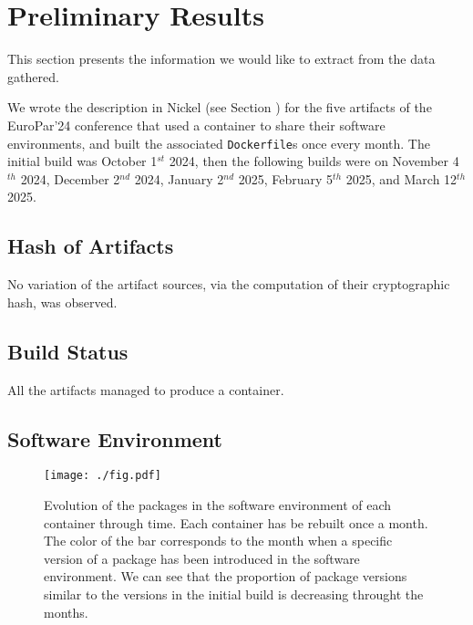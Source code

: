 \documentclass[sigconf,natbib=false]{acmart}
\newcommand{\df}{\texttt{Dockerfile}}
\newcommand{\todo}[1]{{\color{red}{TODO: #1}}}
\begin{document}
\section{Preliminary Results}

This section presents the information we would like to extract from the data gathered.


We wrote the description in Nickel (see Section \todo{}) for the five artifacts of the EuroPar'24 conference that used a container to share their software environments, and built the associated \df s once every month.
The initial build was October 1$^{st}$ 2024, then the following builds were on November 4$^{th}$ 2024, December 2$^{nd}$ 2024, January 2$^{nd}$ 2025, February 5$^{th}$ 2025, and March 12$^{th}$ 2025.
\todo{when was the artifact submission, and publicaiton of the papers for europar?}



\subsection{Hash of Artifacts}

No variation of the artifact sources, via the computation of their cryptographic hash, was observed.

\subsection{Build Status}

All the artifacts managed to produce a container.

\subsection{Software Environment}

\begin{figure*}
  \centering
  \texttt{[image: ./fig.pdf]}
  \caption{
    Evolution of the packages in the software environment of each container through time.
    Each container has be rebuilt once a month.
    The color of the bar corresponds to the month when a specific version of a package has been introduced in the software environment.
    We can see that the proportion of package versions similar to the versions in the initial build is decreasing throught the months.
  }
  \label{fig:results_per_artifact}
\end{figure*}
\end{document}

